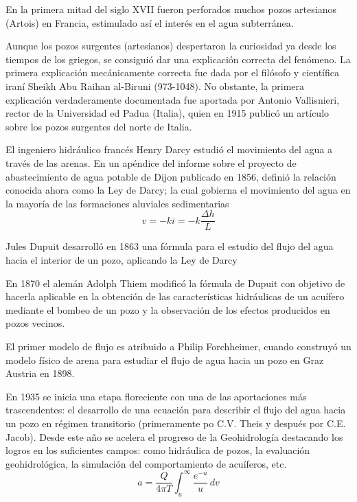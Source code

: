 En la primera mitad del siglo XVII fueron perforados muchos pozos artesianos (Artois) en Francia, estimulado así el interés en el agua subterránea.


Aunque los pozos surgentes (artesianos) despertaron la curiosidad ya desde los tiempos de los griegos, se consiguió dar una explicación correcta del fenómeno. La primera explicación mecánicamente correcta fue dada por el filósofo y científica iraní Sheikh Abu Raihan al-Biruni (973-1048). No obstante, la primera explicación verdaderamente documentada fue aportada por Antonio Vallisnieri, rector de la Universidad ed Padua (Italia), quien en 1915 publicó un artículo sobre los pozos surgentes del norte de Italia.

El ingeniero hidráulico francés Henry Darcy estudió el movimiento del agua a través de las arenas. En un apéndice del informe sobre el proyecto de abastecimiento de agua potable de Dijon publicado en 1856, definió la relación conocida ahora como la Ley de Darcy; la cual gobierna el movimiento del agua en la mayoría de las formaciones aluviales sedimentarias
\begin{equation}
    v =-ki =-k\frac{\Delta h}{L}
\end{equation}

Jules Dupuit desarrolló en 1863 una fórmula para el estudio del flujo del agua hacia el interior de un pozo, aplicando la Ley de Darcy

En 1870 el alemán Adolph Thiem modificó la fórmula de Dupuit con objetivo de hacerla aplicable en la obtención de las características hidráulicas de un acuífero mediante el bombeo de un pozo y la observación de los efectos producidos en pozos vecinos.

El primer modelo de flujo es atribuido a Philip Forchheimer, cuando construyó un modelo físico de arena para estudiar el flujo de agua hacia un pozo en Graz Austria en 1898.

En 1935 se inicia una etapa floreciente con una de las aportaciones más trascendentes: el desarrollo de una ecuación para describir el flujo del agua hacia un pozo en régimen transitorio (primeramente po C.V. Theis y después por C.E. Jacob). Desde este año se acelera el progreso de la Geohidrología destacando los logros en los suficientes campos: como hidráulica de pozos, la evaluación geohidrológica, la simulación del comportamiento de acuíferos, etc.
\begin{equation}
    a=\frac{Q}{4\pi T}\int_{u}^{\infty} \frac{e^{- u}}{u}\, dv
\end{equation}

